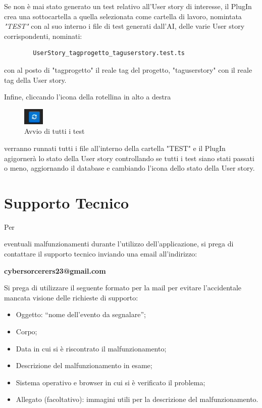 \documentclass{article}
\begin{document}
Se non è mai stato generato un test relativo all'User story di interesse, il PlugIn crea una sottocartella a quella selezionata come cartella di lavoro, nomintata \textit{"TEST"} con al suo interno i file di test generati dall'AI, delle varie User story corrispondenti, nominati:
\begin{center}
    \begin{verbatim}
        UserStory_tagprogetto_taguserstory.test.ts 
    \end{verbatim} con al posto di "tagprogetto" il reale tag del progetto, "taguserstory" con il reale tag della User story.
\end{center}
Infine, cliccando l'icona della rotellina in alto a destra
    \begin{figure}[H]
      \centering
      \includegraphics{documenti/Screenshot manuale utente/rotellina.png}
      \caption{Avvio di tutti i test}
      \label{avvtest}
    \end{figure}
verranno runnati tutti i file all'interno della cartella "TEST" e il PlugIn agigornerà lo stato della User story controllando se tutti i test siano stati passati o meno, aggiornando il database e cambiando l'icona dello stato della User story.













\section{Supporto Tecnico}
\hypertarget{linkSup}{Per} eventuali malfunzionamenti durante l’utilizzo dell’applicazione, si prega di contattare il supporto tecnico inviando una email all’indirizzo:
\begin{center}
    \textbf{cybersorcerers23@gmail.com}
\end{center}
Si prega di utilizzare il seguente formato per la mail per evitare l'accidentale mancata visione delle richieste di supporto:
\begin{itemize}
    \item Oggetto: “nome dell’evento da segnalare”;
    \item Corpo;
    \item Data in cui si è riscontrato il malfunzionamento;
    \item Descrizione del malfunzionamento in esame;
    \item Sistema operativo e browser in cui si è verificato il problema;
    \item Allegato (facoltativo): immagini utili per la descrizione del malfunzionamento.
\end{itemize}
\end{document}
